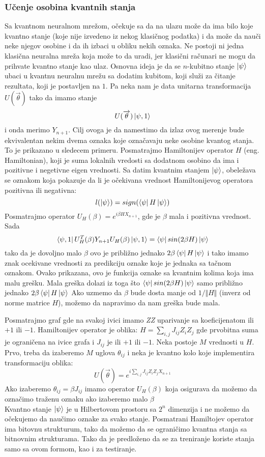 \documentclass[12pt, letterpaper, oneside]{article}
\begin{document}
\subsubsection{Učenje osobina kvantnih stanja}
Sa kvantnom neuralnom mrežom, očekuje sa da na ulazu može da ima bilo koje kvantno stanje (koje nije izvedeno iz nekog klasičnog podatka)
i da može da nauči neke njegov osobine i da ih izbaci u obliku nekih oznaka. Ne postoji ni jedna klasična neuralna mreža koja može to da uradi, jer klasični računari ne mogu da prihvate kvantno stanje kao ulaz.
Osnovna ideja je da se $n$-kubitno stanje $\Ket{\psi}$ ubaci u kvantnu neuralnu mrežu sa dodatim kubitom, koji služi za čitanje rezultata, koji je postavljen na $1$.
Pa neka nam je data unitarna transformacija $U(\overrightarrow{\theta})$ tako da imamo stanje
\[
    U(\overrightarrow{\theta})\Ket{\psi,1}
\] 
i onda merimo $Y_{n+1}$. Cilj ovoga je da namestimo da izlaz ovog merenje bude ekvivalentan nekim dvema oznaka koje označavaju neke osobine kvantog stanja.
To je prikazano u sledecem primeru.
Posmatrajmo Hamiltonijev operator $H$ (eng. Hamiltonian), koji je suma lokalnih vredosti sa dodatnom osobino da ima i pozitivne i negetivne eigen vrednosti.
Sa datim kvantnim stanjem $\ket{\psi}$, obeležava se oznakom koja pokazuje da li je očekivana vrednost Hamiltonijevog operatora pozitivna ili negativna:
\[
    l(\Ket{\psi}) = sign(\bra{\psi}H\Ket{\psi})
\]
Posmatrajmo operator $U_H(\beta) = e^{i\beta HX_{n+1}}$, gde je $\beta$ mala i pozitivna vrednost. Sada
\[
    \Bra{\psi,1}U_H^T(\beta)Y_{n+1}U_H(\beta)\Ket{\psi,1} = \bra{\psi}sin(2\beta H)\Ket{\psi}
\]
tako da je dovoljno malo $\beta$ ovo je približno jednako $2\beta\bra{\psi}H\Ket{\psi}$ i tako imamo znak ocekivane vrednosti za 
predikciju oznake koje je jednaka sa tačnom oznakom. Ovako prikazana, ovo je funkcija oznake sa kvantnim kolima koja ima malu grešku.
Mala greška dolazi iz toga što $\bra{\psi}sin(2\beta H)\Ket{\psi}$ samo približno jednako $2\beta\bra{\psi}H\Ket{\psi}$
Ako uzmemo da $\beta$ bude dosta manje od $1/\Vert H \Vert$ (inverz od norme matrice $H$), možemo da napravimo da nam greška bude mala.

Posmatrajmo graf gde na svakoj ivici imamo \textit{ZZ} uparivanje sa koeficijenatom ili $+1$ ili $-1$.
Hamiltonijev operator je oblika: $H = \sum_{i,j}J_{ij}Z_iZ_j$ gde prvobitna suma je ograničena na ivice grafa i $J_{ij}$ je ili $+1$ ili $-1$.
Neka postoje $M$ vrednosti u $H$. Prvo, treba da izaberemo $M$ uglova $\theta_{ij}$ i neka je kvantno kolo koje implementira transformaciju oblika:
\[
    U(\overrightarrow{\theta}) = e^{i\sum_{i,j}J_{ij}Z_iZ_jX_{n+1}}
\]
Ako izaberemo $\theta_{ij}=\beta J_{ij}$ imamo operator $U_H(\beta)$ koja osigurava da možemo da označimo traženu oznaku ako izaberemo malo $\beta$ \\
Kvantno stanje $\Ket{\psi}$ je u Hilbertovom prostoru sa $2^n$ dimenzija i ne možemo da očekujemo da naučimo oznake za svako stanje.
Posmatrani Hamiltojev operator ima bitovnu strukturum, tako da možemo da se ograničimo kvantna stanja sa bitnovnim strukturama.
Tako da je predloženo da se za treniranje koriste stanja samo sa ovom formom, kao i za testiranje.
\end{document}
